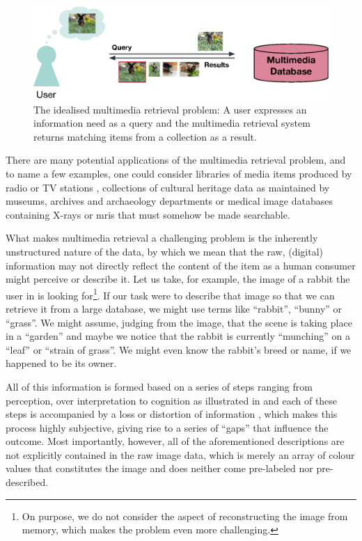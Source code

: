 \begin{figure}[tb]
    \centering
    \includegraphics[width=\textwidth]{figures/mr-ideal.eps}
    \caption{The idealised multimedia retrieval problem: A user expresses an information need as a query and the multimedia retrieval system returns matching items from a collection as a result.}
    \label{figure:mr-ideal}
\end{figure}

There are many potential applications of the multimedia retrieval problem, and to name a few examples, one could consider libraries of media items produced by radio or TV stations \cite{Watanabe:1998Multimedia}, collections of cultural heritage data as maintained by museums, archives and archaeology departments \cite{Tsai:2007Review} or medical image databases containing X-rays or \acrshort{mri}s \cite{Mueller:2004Review} that must somehow be made searchable.

What makes multimedia retrieval a challenging problem is the inherently unstructured nature of the data, by which we mean that the raw, (digital) information may not directly reflect the content of the item as a human consumer might perceive or describe it. Let us take, for example, the image of a rabbit the user in  is looking for\footnote{On purpose, we do not consider the aspect of reconstructing the image from memory, which makes the problem even more challenging.}. If our task were to describe that image so that we can retrieve it from a large database, we might use terms like ``rabbit'', ``bunny'' or ``grass''. We might assume, judging from the image, that the scene is taking place in a ``garden'' and maybe we notice that the rabbit is currently ``munching'' on a ``leaf'' or ``strain of grass''. We might even know the rabbit's breed or name, if we happened to be its owner.

All of this information is formed based on a series of steps ranging from perception, over interpretation to cognition as illustrated in  and each of these steps is accompanied by a loss or distortion of information \cite{Javanmardi:2021Exploring,Rossetto:2018thesis}, which makes this process highly subjective, giving rise to a series of ``gaps'' that influence the outcome. Most importantly, however, all of the aforementioned descriptions are not explicitly contained in the raw image data, which is merely an array of colour values that constitutes the image and does neither come pre-labeled nor pre-described.

